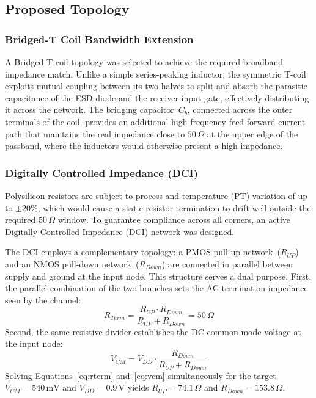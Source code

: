 \subsection{Proposed Topology}

\subsubsection*{Bridged-T Coil Bandwidth Extension}

A Bridged-T coil topology was selected to achieve the required broadband impedance match.
Unlike a simple series-peaking inductor, the symmetric T-coil exploits mutual coupling
between its two halves to split and absorb the parasitic capacitance of the ESD diode and
the receiver input gate, effectively distributing it across the network. The bridging
capacitor~$C_b$, connected across the outer terminals of the coil, provides an additional
high-frequency feed-forward current path that maintains the real impedance close to $50\,\Omega$
at the upper edge of the passband, where the inductors would otherwise present a high impedance.

\newpage
\subsubsection*{Digitally Controlled Impedance (DCI)}

Polysilicon resistors are subject to process and temperature (PT) variation of up to
$\pm 20\%$, which would cause a static resistor termination to drift well outside the
required $50\,\Omega$ window. To guarantee compliance across all corners, an active
Digitally Controlled Impedance (DCI) network was designed.

\vspace{\baselineskip}

The DCI employs a complementary topology: a PMOS pull-up network~($R_{UP}$) and an NMOS
pull-down network~($R_{Down}$) are connected in parallel between supply and ground at
the input node. This structure serves a dual purpose. First, the parallel combination of
the two branches sets the AC termination impedance seen by the channel:
\begin{equation}
    R_{Term} = \frac{R_{UP} \cdot R_{Down}}{R_{UP} + R_{Down}} = 50\,\Omega
    \label{eq:rterm}
\end{equation}
Second, the same resistive divider establishes the DC common-mode voltage at the input node:
\begin{equation}
    V_{CM} = V_{DD} \cdot \frac{R_{Down}}{R_{UP} + R_{Down}}
    \label{eq:vcm}
\end{equation}
Solving Equations~\eqref{eq:rterm} and~\eqref{eq:vcm} simultaneously for the target
$V_{CM} = 540\,\text{mV}$ and $V_{DD} = 0.9\,\text{V}$ yields $R_{UP} = 74.1\,\Omega$
and $R_{Down} = 153.8\,\Omega$.

